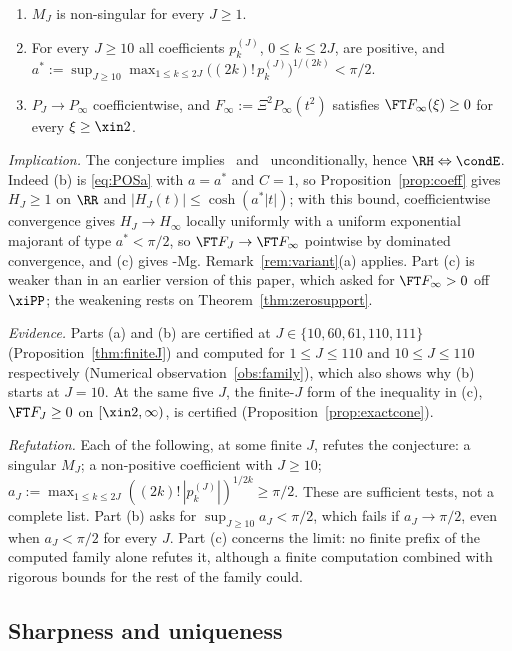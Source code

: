 \begin{conjecture}\label{conj:family}
\begin{enumerate}[label=\textup{(\alph*)}]
\item $M_J$ is non-singular for every $J\ge1$.
\item For every $J\ge10$ all coefficients $p^{(J)}_k$, $0\le k\le2J$, are positive, and
$a^*:=\sup_{J\ge10}\max_{1\le k\le2J}\bigl((2k)!\,p^{(J)}_k\bigr)^{1/(2k)}<\pi/2$.
\item $P_J\to P_\infty$ coefficientwise, and $F_\infty:=\Xi^2P_\infty(t^2)$ satisfies $\FT F_\infty(\xi)\ge0$ for every $\xi\ge\xin2$.
\end{enumerate}
\end{conjecture}

\emph{Implication.} The conjecture implies \condS\ and \condU\ unconditionally, hence $\RH\Leftrightarrow\condE$. Indeed (b) is
\eqref{eq:POSa} with $a=a^*$ and $C=1$, so Proposition~\ref{prop:coeff} gives $H_J\ge1$ on $\RR$ and $|H_J(t)|\le\cosh(a^*|t|)$; with this
bound, coefficientwise convergence gives $H_J\to H_\infty$ locally uniformly with a uniform exponential majorant of type $a^*<\pi/2$, so
$\FT F_J\to\FT F_\infty$ pointwise by dominated convergence, and (c) gives \hyp{Mg}. Remark~\ref{rem:variant}(a) applies. Part (c) is
weaker than in an earlier version of this paper, which asked for $\FT F_\infty>0$ off $\xiPP$; the weakening rests on
Theorem~\ref{thm:zerosupport}.

\emph{Evidence.} Parts (a) and (b) are certified at $J\in\{10,60,61,110,111\}$ (Proposition~\ref{thm:finiteJ}) and computed for
$1\le J\le110$ and $10\le J\le110$ respectively (Numerical observation~\ref{obs:family}), which also shows why (b) starts at $J=10$. At the
same five $J$, the finite-$J$ form of the inequality in (c), $\FT F_J\ge0$ on $[\xin2,\infty)$, is certified (Proposition~\ref{prop:exactcone}).

\emph{Refutation.} Each of the following, at some finite $J$, refutes the conjecture: a singular $M_J$; a non-positive coefficient with
$J\ge10$; $a_J:=\max_{1\le k\le2J}((2k)!\,|p^{(J)}_k|)^{1/2k}\ge\pi/2$. These are sufficient tests, not a complete list. Part (b) asks for
$\sup_{J\ge10}a_J<\pi/2$, which fails if $a_J\to\pi/2$, even when $a_J<\pi/2$ for every $J$. Part (c) concerns the limit: no finite prefix of
the computed family alone refutes it, although a finite computation combined with rigorous bounds for the rest of the family could.

\subsection{Sharpness and uniqueness}

